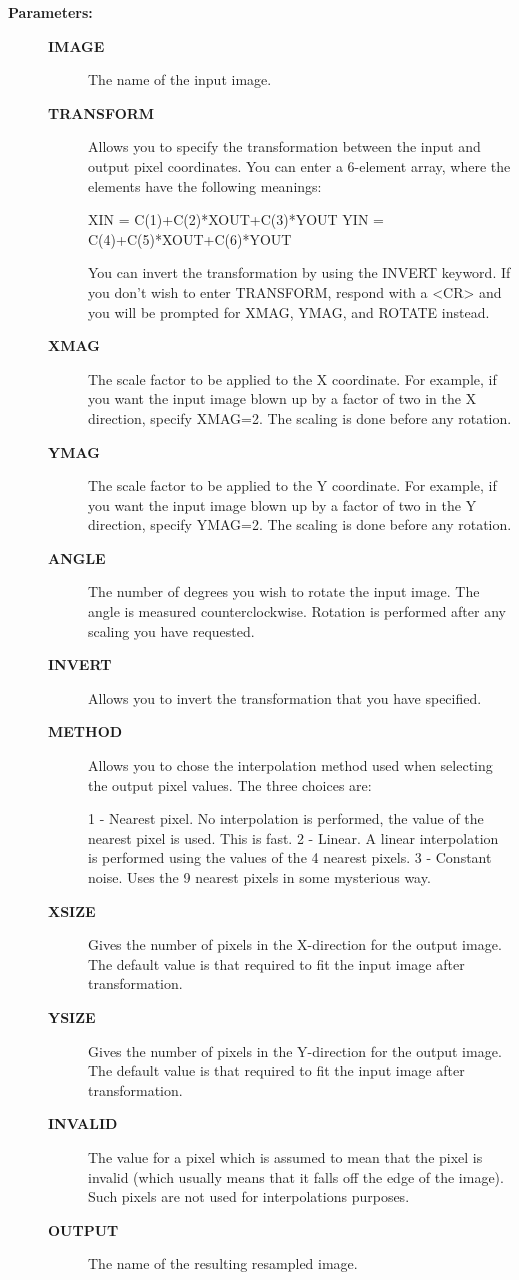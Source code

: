 \begin{description}
\begin{description}
\item [\textbf{Parameters:}]
\begin{description}
\item [\textbf{IMAGE}]
 The name of the input image.
\item [\textbf{TRANSFORM}]
 Allows you to specify the transformation between the input
 and output pixel coordinates.  You can enter a 6-element
 array, where the elements have the following meanings:

    XIN = C(1)+C(2)*XOUT+C(3)*YOUT
    YIN = C(4)+C(5)*XOUT+C(6)*YOUT

 You can invert the transformation by using the INVERT
 keyword. If you don't wish to enter TRANSFORM, respond
 with a <CR> and you will be prompted for XMAG, YMAG,
 and ROTATE instead.
\item [\textbf{XMAG}]
 The scale factor to be applied to the X
 coordinate. For example, if you want the input image
 blown up by a factor of two in the X direction, specify
 XMAG=2. The scaling is done before any rotation.
\item [\textbf{YMAG}]
 The scale factor to be applied to the Y
 coordinate. For example, if you want the input image
 blown up by a factor of two in the Y direction, specify
 YMAG=2. The scaling is done before any rotation.
\item [\textbf{ANGLE}]
 The number of degrees you wish to rotate the
 input image. The angle is measured counterclockwise.
 Rotation is performed after any scaling you have
 requested.
\item [\textbf{INVERT}]
 Allows you to invert the transformation that you
 have specified.
\item [\textbf{METHOD}]
 Allows you to chose the interpolation method
 used when selecting the output pixel values. The three
 choices are:

    1 - Nearest pixel. No interpolation is performed, the
        value of the nearest pixel is used. This is fast.
    2 - Linear. A linear interpolation is performed using
        the values of the 4 nearest pixels.
    3 - Constant noise. Uses the 9 nearest pixels in some
        mysterious way.
\item [\textbf{XSIZE}]
 Gives the number of pixels in the X-direction
 for the output image. The default value is that
 required to fit the input image after transformation.
\item [\textbf{YSIZE}]
 Gives the number of pixels in the Y-direction
 for the output image. The default value is that
 required to fit the input image after transformation.
\item [\textbf{INVALID}]
 The value for a pixel which is assumed to mean that
 the pixel is invalid (which usually means that it
 falls off the edge of the image). Such pixels are
 not used for interpolations purposes.
\item [\textbf{OUTPUT}]
 The name of the resulting resampled image.
\end{description}


\end{description}
\end{description}
